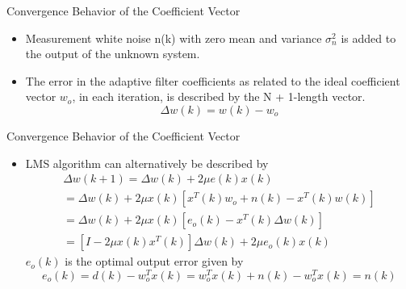 \documentclass{beamer}
\begin{document}
\begin{frame}{Convergence Behavior of the Coefficient Vector}
    \begin{itemize}
       \item Measurement white noise n(k) with zero mean and variance $\sigma^2_n$  is added to the output of the unknown system.
        \item The error in the adaptive filter coefficients as related to the ideal coefficient vector $w_o$, in each iteration, is described by the N + 1-length vector.
        \begin{equation}
            \Delta w(k)=w(k) - w_o
        \end{equation}
    \end{itemize}
\end{frame}

\begin{frame}{Convergence Behavior of the Coefficient Vector}
    \begin{itemize}
       \item LMS algorithm can alternatively be described by
        \begin{multline}
            \Delta w(k+1)=\Delta w(k) + 2\mu e(k)x(k)\\
                         =\Delta w(k) + 2\mu x(k)[x^T(k)w_o + n(k) - x^T(k)w(k)]\\
                         =\Delta w(k) + 2\mu x(k)[e_o(k) - x^T(k)\Delta w(k)]\\
                         =[I - 2\mu x(k)x^T(k)]\Delta w(k) + 2\mu e_o(k)x(k)
        \end{multline}
        $e_o(k)$ is the optimal output error given by 
        \begin{equation}
            e_o(k) = d(k) - w^T_o x(k) = w_o^T x(k) + n(k) -w_o^T x(k)=n(k)
        \end{equation}
    \end{itemize}
\end{frame}
\end{document}
